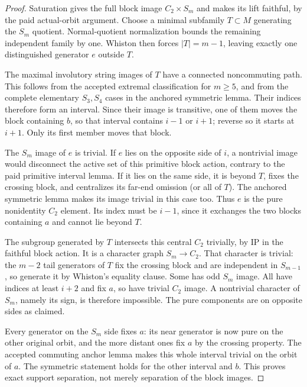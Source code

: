 \documentclass[11pt,a4paper]{article}
\begin{document}
\begin{proof}
Saturation gives the full block image $C_2\times S_m$ and makes
its lift faithful, by the paid actual-orbit argument. Choose a
minimal subfamily $T\subset M$ generating the $S_m$ quotient.
Normal-quotient normalization bounds the remaining independent
family by one. Whiston then forces $|T|=m-1$, leaving exactly
one distinguished generator $e$ outside $T$.

The maximal involutory string images of $T$ have a connected
noncommuting path. This follows from the accepted extremal
classification for $m\geq5$, and from the complete elementary
$S_3,S_4$ cases in the anchored symmetric lemma. Their indices
therefore form an interval. Since their image is transitive,
one of them moves the block containing $b$, so that interval
contains $i-1$ or $i+1$; reverse so it starts at $i+1$.
Only its first member moves that block.

The $S_m$ image of $e$ is trivial. If $e$ lies on the opposite
side of $i$, a nontrivial image would disconnect the active set
of this primitive block action, contrary to the paid primitive
interval lemma. If it lies on the same side, it is beyond $T$,
fixes the crossing block, and centralizes its far-end omission
(or all of $T$). The anchored symmetric lemma makes its image
trivial in this case too. Thus $e$ is the pure nonidentity
$C_2$ element. Its index must be $i-1$, since it exchanges
the two blocks containing $a$ and cannot lie beyond $T$.

The subgroup generated by $T$ intersects this central $C_2$
trivially, by IP in the faithful block action. It is a character
graph $S_m\to C_2$. That character is trivial: the $m-2$ tail
generators of $T$ fix the crossing block and are independent in
$S_{m-1}$, so generate it by Whiston's equality clause. Some
has odd $S_m$ image. All have indices at least $i+2$ and fix
$a$, so have trivial $C_2$ image. A nontrivial character of
$S_m$, namely its sign, is therefore impossible. The pure
components are on opposite sides as claimed.

Every generator on the $S_m$ side fixes $a$: its near generator
is now pure on the other original orbit, and the more distant
ones fix $a$ by the crossing property. The accepted commuting
anchor lemma makes this whole interval trivial on the orbit of
$a$. The symmetric statement holds for the other interval and
$b$. This proves exact support separation, not merely separation
of the block images.
\end{proof}
\end{document}
